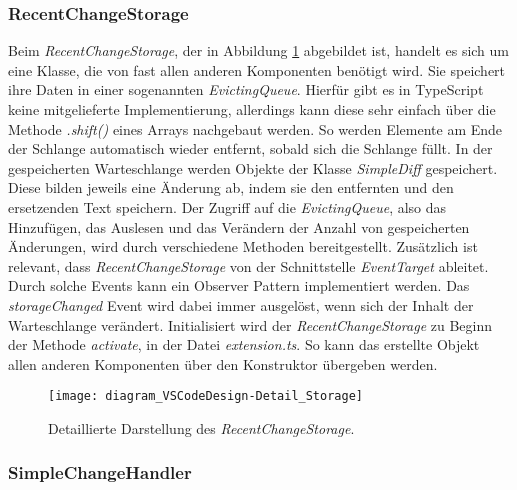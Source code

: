 \subsubsection{RecentChangeStorage}

Beim \emph{RecentChangeStorage}, 
der in Abbildung \ref{fig:diagram_VSCodeDesign-Detail_Storage} abgebildet ist,
handelt es sich um eine Klasse, die
von fast allen anderen Komponenten benötigt wird. Sie speichert ihre
Daten in einer sogenannten \emph{EvictingQueue}. Hierfür gibt es in
TypeScript keine mitgelieferte Implementierung, allerdings kann
diese sehr einfach über die Methode \emph{.shift()} eines Arrays
nachgebaut werden. So werden Elemente am Ende der Schlange automatisch
wieder entfernt, sobald sich die Schlange füllt. 
In der gespeicherten Warteschlange werden
Objekte der Klasse \emph{SimpleDiff} gespeichert. Diese bilden jeweils
eine Änderung ab, indem sie den entfernten und den ersetzenden Text
speichern. Der Zugriff auf die \emph{EvictingQueue}, also das Hinzufügen, 
das Auslesen und das Verändern der Anzahl von gespeicherten
Änderungen, wird durch verschiedene Methoden bereitgestellt.
Zusätzlich ist relevant, dass \emph{RecentChangeStorage} von der
Schnittstelle \emph{EventTarget} ableitet. Durch solche Events
kann ein Observer Pattern implementiert werden. Das \emph{storageChanged}
Event wird dabei immer ausgelöst, wenn sich der Inhalt der Warteschlange
verändert. Initialisiert wird der \emph{RecentChangeStorage} zu Beginn der
Methode \emph{activate}, in der Datei \emph{extension.ts}. So kann
das erstellte Objekt allen anderen Komponenten über den Konstruktor
übergeben werden.

\begin{figure}
    \centering
    \texttt{[image: diagram\_VSCodeDesign-Detail\_Storage]}
    \caption{Detaillierte Darstellung des \emph{RecentChangeStorage}.}
    \label{fig:diagram_VSCodeDesign-Detail_Storage}
\end{figure}   

\subsubsection{SimpleChangeHandler}

